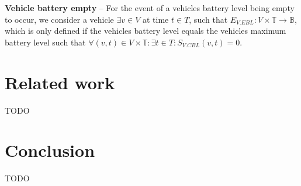 \documentclass[graybox]{svmult}
\begin{document}
\vspace{4mm}
\noindent
\textbf{Vehicle battery empty}
--
For the event of a vehicles battery level being empty to occur, we consider a vehicle $\exists v \in V$ at time $t \in T$, such that $E_{V.EBL}: V \times \mathbb{T} \rightarrow \mathbb{B}$, which is only defined if the vehicles battery level equals the vehicles maximum battery level such that $\forall (v,t) \in V \times \mathbb{T}: \exists t \in T: S_{V.CBL}(v,t) = 0.$

\section{Related work}
\label{sec:related}
TODO

\section{Conclusion}
\label{sec:con}
TODO



\end{document}
